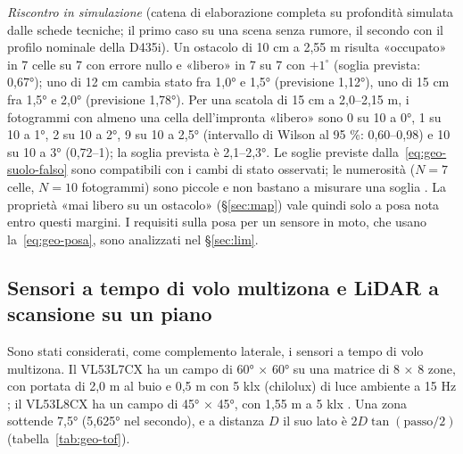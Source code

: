 \emph{Riscontro in simulazione} (catena di elaborazione completa su profondità simulata dalle schede tecniche; il primo caso su una scena senza rumore, il secondo con il profilo nominale della D435i). Un ostacolo di 10 cm a 2,55 m risulta «occupato» in 7 celle su 7 con errore nullo e «libero» in 7 su 7 con $+1^\circ$ (soglia prevista: 0,67°); uno di 12 cm cambia stato fra 1,0° e 1,5° (previsione 1,12°), uno di 15 cm fra 1,5° e 2,0° (previsione 1,78°). Per una scatola di 15 cm a 2,0--2,15 m, i fotogrammi con almeno una cella dell'impronta «libero» sono 0 su 10 a 0°, 1 su 10 a 1°, 2 su 10 a 2°, 9 su 10 a 2,5° (intervallo di Wilson al 95 \%: 0,60--0,98) e 10 su 10 a 3° (0,72--1); la soglia prevista è 2,1--2,3°. Le soglie previste dalla~\eqref{eq:geo-suolo-falso} sono compatibili con i cambi di stato osservati; le numerosità ($N=7$ celle, $N=10$ fotogrammi) sono piccole e non bastano a misurare una soglia . La proprietà «mai libero su un ostacolo» (\S\ref{sec:map}) vale quindi solo a posa nota entro questi margini. I requisiti sulla posa per un sensore in moto, che usano la~\eqref{eq:geo-posa}, sono analizzati nel \S\ref{sec:lim}.

\subsection{Sensori a tempo di volo multizona e LiDAR a scansione su un piano}\label{sec:geo-altri}

Sono stati considerati, come complemento laterale, i sensori a tempo di volo multizona. Il VL53L7CX ha un campo di 60° × 60° su una matrice di 8 × 8 zone, con portata di 2,0 m al buio e 0,5 m con 5 klx (chilolux) di luce ambiente a 15 Hz \cite{st-vl53l7cx}; il VL53L8CX ha un campo di 45° × 45°, con 1,55 m a 5 klx \cite{st-vl53l8cx}. Una zona sottende 7,5° (5,625° nel secondo), e a distanza $D$ il suo lato è $2D\tan(\text{passo}/2)$ (tabella~\ref{tab:geo-tof}).

